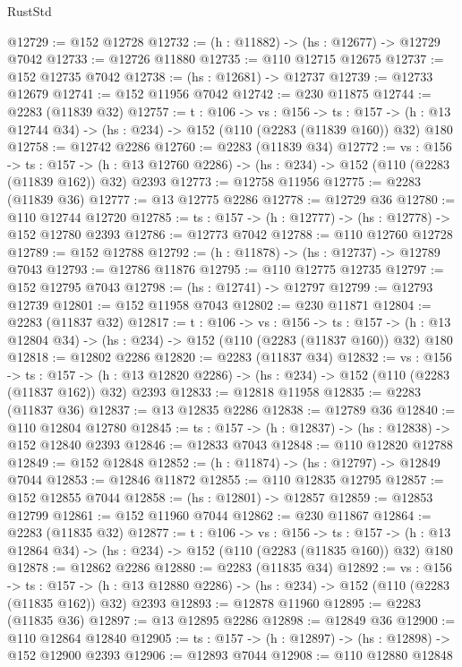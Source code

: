 \begin{lexlean}{RustStd}
\begin{coremodule}
@12729 := @152 @12728
@12732 := (h : @11882) -> (hs : @12677) -> @12729 @7042
@12733 := @12726 @11880
@12735 := @110 @12715 @12675
@12737 := @152 @12735 @7042
@12738 := (hs : @12681) -> @12737
@12739 := @12733 @12679
@12741 := @152 @11956 @7042
@12742 := @230 @11875
@12744 := @2283 (@11839 @32)
@12757 := {t : @106} ->
  {vs : @156} ->
  {ts : @157} -> (h : @13 @12744 @34) -> (hs : @234) -> @152 (@110 (@2283 (@11839 @160)) @32) @180
@12758 := @12742 @2286
@12760 := @2283 (@11839 @34)
@12772 := {vs : @156} ->
  {ts : @157} ->
  (h : @13 @12760 @2286) -> (hs : @234) -> @152 (@110 (@2283 (@11839 @162)) @32) @2393
@12773 := @12758 @11956
@12775 := @2283 (@11839 @36)
@12777 := @13 @12775 @2286
@12778 := @12729 @36
@12780 := @110 @12744 @12720
@12785 := {ts : @157} -> (h : @12777) -> (hs : @12778) -> @152 @12780 @2393
@12786 := @12773 @7042
@12788 := @110 @12760 @12728
@12789 := @152 @12788
@12792 := (h : @11878) -> (hs : @12737) -> @12789 @7043
@12793 := @12786 @11876
@12795 := @110 @12775 @12735
@12797 := @152 @12795 @7043
@12798 := (hs : @12741) -> @12797
@12799 := @12793 @12739
@12801 := @152 @11958 @7043
@12802 := @230 @11871
@12804 := @2283 (@11837 @32)
@12817 := {t : @106} ->
  {vs : @156} ->
  {ts : @157} -> (h : @13 @12804 @34) -> (hs : @234) -> @152 (@110 (@2283 (@11837 @160)) @32) @180
@12818 := @12802 @2286
@12820 := @2283 (@11837 @34)
@12832 := {vs : @156} ->
  {ts : @157} ->
  (h : @13 @12820 @2286) -> (hs : @234) -> @152 (@110 (@2283 (@11837 @162)) @32) @2393
@12833 := @12818 @11958
@12835 := @2283 (@11837 @36)
@12837 := @13 @12835 @2286
@12838 := @12789 @36
@12840 := @110 @12804 @12780
@12845 := {ts : @157} -> (h : @12837) -> (hs : @12838) -> @152 @12840 @2393
@12846 := @12833 @7043
@12848 := @110 @12820 @12788
@12849 := @152 @12848
@12852 := (h : @11874) -> (hs : @12797) -> @12849 @7044
@12853 := @12846 @11872
@12855 := @110 @12835 @12795
@12857 := @152 @12855 @7044
@12858 := (hs : @12801) -> @12857
@12859 := @12853 @12799
@12861 := @152 @11960 @7044
@12862 := @230 @11867
@12864 := @2283 (@11835 @32)
@12877 := {t : @106} ->
  {vs : @156} ->
  {ts : @157} -> (h : @13 @12864 @34) -> (hs : @234) -> @152 (@110 (@2283 (@11835 @160)) @32) @180
@12878 := @12862 @2286
@12880 := @2283 (@11835 @34)
@12892 := {vs : @156} ->
  {ts : @157} ->
  (h : @13 @12880 @2286) -> (hs : @234) -> @152 (@110 (@2283 (@11835 @162)) @32) @2393
@12893 := @12878 @11960
@12895 := @2283 (@11835 @36)
@12897 := @13 @12895 @2286
@12898 := @12849 @36
@12900 := @110 @12864 @12840
@12905 := {ts : @157} -> (h : @12897) -> (hs : @12898) -> @152 @12900 @2393
@12906 := @12893 @7044
@12908 := @110 @12880 @12848

\end{coremodule}
\end{lexlean}
